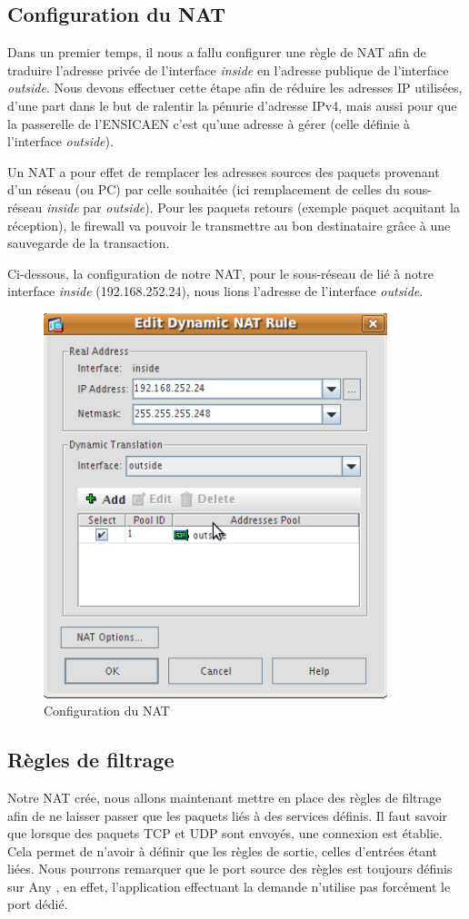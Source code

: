 \documentclass[a4paper,12pt]{article}
\begin{document}
\subsection{Configuration du NAT}
Dans un premier temps, il nous a fallu configurer une règle de NAT afin de traduire l'adresse privée de l'interface \textit{inside} en l'adresse publique de
l'interface \textit{outside}. Nous devons effectuer cette étape afin de réduire les adresses IP utilisées, d'une part dans le but de ralentir la pénurie d'adresse
IPv4, mais aussi pour que la passerelle de l'ENSICAEN c'est qu'une adresse à gérer (celle définie à l'interface \textit{outside}).

Un NAT a pour effet de remplacer les adresses sources des paquets provenant d'un réseau (ou PC) par celle souhaitée (ici remplacement de celles du sous-réseau \textit{inside} par \textit{outside}). Pour les paquets retours (exemple paquet acquitant la réception), le firewall va pouvoir le transmettre
au bon destinataire grâce à une sauvegarde de la transaction.

Ci-dessous, la configuration de notre NAT, pour le sous-réseau de lié à notre interface \textit{inside} (192.168.252.24), nous lions l'adresse de l'interface \textit{outside}.
\begin{figure}[H]
	\center
	\includegraphics[width=10cm]{img/3-natinsideoutside.png}
	\caption{Configuration du NAT}
\end{figure}


\subsection{Règles de filtrage}
Notre NAT crée, nous allons maintenant mettre en place des règles de filtrage afin de ne laisser passer que les paquets liés à des services définis.
Il faut savoir que lorsque des paquets TCP et UDP sont envoyés, une connexion est établie. Cela permet de n'avoir à définir que les règles de sortie, celles
d'entrées étant liées. Nous pourrons remarquer que le port source des règles est toujours définis sur \og Any \fg{}, en effet, l'application effectuant la demande
n'utilise pas forcément le port dédié.
\end{document}
